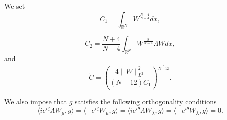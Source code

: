 \documentclass[a4paper,two-side,10pt]{amsart}
\newcommand{\R}{\mathbb{R}}
\numberwithin{equation}{section}
\begin{document}

 
 We set 
$$C_1 = \int_{\R^N} W^{\frac{N+4}{N-4}} dx,$$

$$C_2= \dfrac{N+4}{N-4} \int_{\R^N} W^{\frac{8}{N-4}} \Lambda W dx,$$
and
\begin{equation}\label{1deftildec}
\tilde{C}=\left(\frac{4\|W\|_{L^2}^2}{(N-12)C_1}\right)^{\frac{2}{N-12}}.
\end{equation}


We also impose that $g$ satisfies the following orthogonality conditions
\begin{equation}
\label{ortg}
\langle ie^{i\zeta} \Lambda W_\mu ,g \rangle = \langle -e^{i\zeta}  W_\mu ,g \rangle =\langle ie^{i\theta} \Lambda W_\lambda ,g \rangle = \langle -e^{i\theta}  W_\lambda ,g \rangle =0 .
\end{equation}
\end{document}
